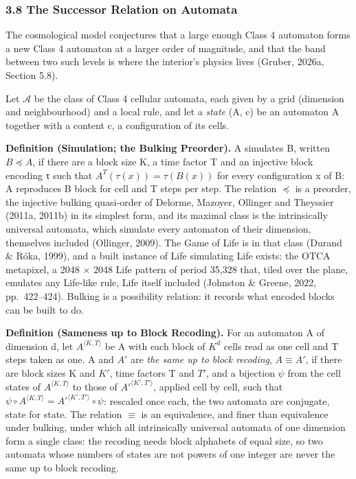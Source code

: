 \documentclass[
]{article}
\begin{document}
\hypertarget{the-successor-relation-on-automata}{%
\subsubsection{3.8 The Successor Relation on
Automata}\label{the-successor-relation-on-automata}}

The cosmological model conjectures that a large enough Class 4 automaton
forms a new Class 4 automaton at a larger order of magnitude, and that
the band between two such levels is where the interior's physics lives
(Gruber, 2026a, Section 5.8).

Let \(\mathcal{A}\) be the class of Class 4 cellular automata, each
given by a grid (dimension and neighbourhood) and a local rule, and let
a \emph{state} (A, c) be an automaton A together with a content c, a
configuration of its cells.

\textbf{Definition (Simulation; the Bulking Preorder).} A simulates B,
written \(B \preccurlyeq A\), if there are a block size K, a time factor
T and an injective block encoding τ such that
\(A^T(\tau(x)) = \tau(B(x))\) for every configuration x of B: A
reproduces B block for cell and T steps per step. The relation
\(\preccurlyeq\) is a preorder, the injective bulking quasi-order of
Delorme, Mazoyer, Ollinger and Theyssier (2011a, 2011b) in its simplest
form, and its maximal class is the intrinsically universal automata,
which simulate every automaton of their dimension, themselves included
(Ollinger, 2009). The Game of Life is in that class (Durand \& Róka,
1999), and a built instance of Life simulating Life exists: the OTCA
metapixel, a 2048 × 2048 Life pattern of period 35,328 that, tiled over
the plane, emulates any Life-like rule, Life itself included (Johnston
\& Greene, 2022, pp.~422--424). Bulking is a possibility relation: it
records what encoded blocks can be built to do.

\textbf{Definition (Sameness up to Block Recoding).} For an automaton A
of dimension d, let \(A^{\langle K, T\rangle}\) be A with each block of
\(K^d\) cells read as one cell and T steps taken as one. A and \(A'\)
are \emph{the same up to block recoding}, \(A \equiv A'\), if there are
block sizes K and \(K'\), time factors T and \(T'\), and a bijection
\(\psi\) from the cell states of \(A^{\langle K, T\rangle}\) to those of
\(A'^{\langle K', T'\rangle}\), applied cell by cell, such that
\(\psi \circ A^{\langle K, T\rangle} = A'^{\langle K', T'\rangle} \circ \psi\):
rescaled once each, the two automata are conjugate, state for state. The
relation \(\equiv\) is an equivalence, and finer than equivalence under
bulking, under which all intrinsically universal automata of one
dimension form a single class: the recoding needs block alphabets of
equal size, so two automata whose numbers of states are not powers of
one integer are never the same up to block recoding.
\end{document}
